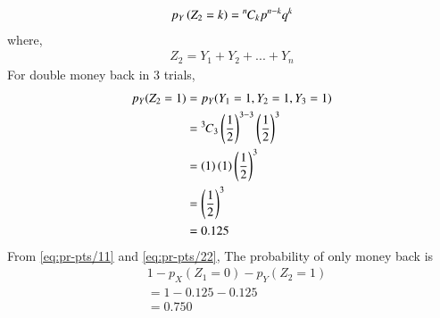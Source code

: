\documentclass[journal,12pt,twocolumn]{IEEEtran}
\theoremstyle{remark}
\begin{document}
\begin{align}
\label{eq:pr-pts/16} p_Y\left(Z_2=k\right) = {{}^{n}\mkern-1muC_{k}}p^{n-k}q^{k}
\end{align}
where,
\begin{align}
	Z_2 = Y_1 + Y_2 + ... + Y_n 
\end{align}
For double money back in 3 trials,
\begin{align}
	p_Y(Z_2 = 1) &= p_Y(Y_1=1,Y_2=1,Y_3=1) \\
 		&= {{}^{3}\mkern-1muC_{3}}\left(\frac{1}{2}\right)^{3-3}\left(\frac{1}{2}\right)^{3} \\
 		&= \left(1\right)\left(1\right)\left(\frac{1}{2}\right)^{3} \\
 		&= \left(\frac{1}{2}\right)^{3} \\
		\label{eq:pr-pts/22} &= 0.125 
\end{align}
From \eqref{eq:pr-pts/11} and \eqref{eq:pr-pts/22}, The probability of only money back is
\begin{align}
& 1 - p_X(Z_1=0) - p_Y(Z_2=1) \\
&= 1 - 0.125 - 0.125 \\
&= 0.750
\end{align}
\end{document}
